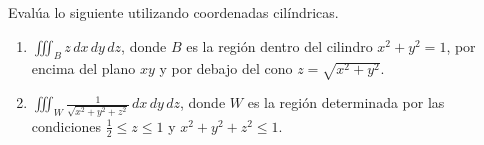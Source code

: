 Evalúa lo siguiente utilizando coordenadas cilíndricas.

\begin{enumerate}[label=(\alph*), itemsep=0.4em, topsep=0.5em]
	\item  \( \displaystyle\iiint_B z \, dx \, dy \, dz \), donde \( B \) es la región dentro del cilindro \( x^2 + y^2 = 1 \), por encima del plano \( xy \) y por debajo del cono \( z = \sqrt{x^2 + y^2} \).
	\item \( \displaystyle\iiint_W \frac{1}{\sqrt{x^2 + y^2 + z^2}} \, dx\, dy\, dz\), donde \( W \) es la región determinada por las condiciones  \( \frac{1}{2} \leq z \leq 1 \) y \( x^2 + y^2 + z^2 \leq 1 \).
\end{enumerate}
